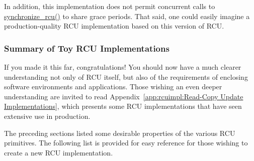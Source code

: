 In addition, this implementation does not permit concurrent calls
to \url{synchronize_rcu()} to share grace periods.
That said, one could easily imagine a production-quality RCU
implementation based on this version of RCU.

\subsubsection{Summary of Toy RCU Implementations}
\label{defer:Summary of Toy RCU Implementations}

If you made it this far, congratulations!
You should now have a much clearer understanding
not only of RCU itself, but also of the requirements of enclosing
software environments and applications.
Those wishing an even deeper understanding are invited to read
Appendix~\ref{app:rcuimpl:Read-Copy Update Implementations},
which presents some RCU implementations that have seen extensive
use in production.

The preceding sections listed some desirable properties of the
various RCU primitives.
The following list is provided for easy reference for those wishing to
create a new RCU implementation.

